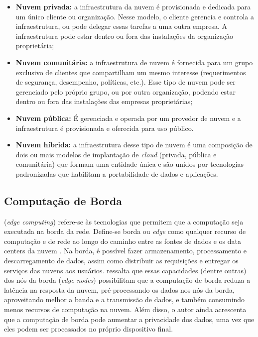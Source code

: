 \begin{itemize}
    
    \item \textbf{Nuvem privada:} a infraestrutura da nuvem é provisionada e
    dedicada para um único cliente ou organização. Nesse modelo, o cliente
    gerencia e controla a infraestrutura, ou pode delegar essas tarefas a uma
    outra empresa. A infraestrutura pode estar dentro ou fora das instalações
    da organização proprietária;

    \item \textbf{Nuvem comunitária:} a infraestrutura de nuvem é fornecida para
    um grupo exclusivo de clientes que compartilham um mesmo interesse
    (requerimentos de segurança, desempenho, políticas, etc.). Esse tipo de
    nuvem pode ser gerenciado pelo próprio grupo, ou por outra organização,
    podendo estar dentro ou fora das instalações das empresas proprietárias;

    \item \textbf{Nuvem pública:} É gerenciada e operada por um provedor de nuvem
    e a infraestrutura é provisionada e oferecida para uso público.
    
    \item \textbf{Nuvem híbrida:} a infraestrutura desse tipo de nuvem é uma
    composição de dois ou mais modelos de implantação de \emph{cloud} (privada,
    pública e comunitária) que formam uma entidade única e são unidos por
    tecnologias padronizadas que habilitam a portabilidade de dados e
    aplicações.

\end{itemize}

\subsection{Computação de Borda}

 (\emph{edge computing}) refere-se às
tecnologias que permitem que a computação seja executada na borda da rede.
Define-se borda ou \emph{edge} como qualquer recurso de computação e de rede ao
longo do caminho entre as fontes de dados e os data centers da nuvem
\cite{Shi2016}. Na borda, é possível fazer armazenamento, processamento e
descarregamento de dados, assim como distribuir as requisições e entregar os
serviços das nuvens aos usuários.  ressalta que essas
capacidades (dentre outras) dos nós da borda (\emph{edge nodes}) possibilitam que a
computação de borda reduza a latência na resposta da nuvem, pré-processando os
dados nos nós da borda, aproveitando melhor a banda e a transmissão de dados, e
também consumindo menos recursos de computação na nuvem. Além disso, o autor
ainda acrescenta que a computação de borda pode aumentar a privacidade dos
dados, uma vez que eles podem ser processados no próprio dispositivo final.

